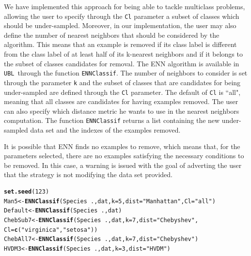 \documentclass[10pt,a4paper]{article}\usepackage[]{graphicx}\usepackage[]{color}
\makeatletter
\newcommand{\hlnum}[1]{\textcolor[rgb]{0.686,0.059,0.569}{#1}}%
\newcommand{\hlstr}[1]{\textcolor[rgb]{0.192,0.494,0.8}{#1}}%
\newcommand{\hlopt}[1]{\textcolor[rgb]{0,0,0}{#1}}%
\newcommand{\hlstd}[1]{\textcolor[rgb]{0.345,0.345,0.345}{#1}}%
\newcommand{\hlkwb}[1]{\textcolor[rgb]{0.69,0.353,0.396}{#1}}%
\newcommand{\hlkwc}[1]{\textcolor[rgb]{0.333,0.667,0.333}{#1}}%
\newcommand{\hlkwd}[1]{\textcolor[rgb]{0.737,0.353,0.396}{\textbf{#1}}}%
\newenvironment{kframe}{%
 \def\at@end@of@kframe{}%
 \ifinner\ifhmode%
  \def\at@end@of@kframe{\end{minipage}}%
  \begin{minipage}{\columnwidth}%
 \fi\fi%
 \def\FrameCommand##1{\hskip\@totalleftmargin \hskip-\fboxsep
 \colorbox{shadecolor}{##1}\hskip-\fboxsep
     \hskip-\linewidth \hskip-\@totalleftmargin \hskip\columnwidth}%
 \MakeFramed {\advance\hsize-\width
   \@totalleftmargin\z@ \linewidth\hsize
   \@setminipage}}%
 {\par\unskip\endMakeFramed%
 \at@end@of@kframe}
\newenvironment{knitrout}{}{} %
\newcommand{\UBL}{\texttt{UBL}\ }
\makeatother
\begin{document}
We have implemented this approach for being able to tackle multiclass problems, allowing the user to specify through the \texttt{Cl} parameter a subset of classes which should be under-sampled. Moreover, in our implementation, the user may also define the number of nearest neighbors that should be considered by the algorithm. This means that an example is removed if its class label is different from the class label of at least half of its k-nearest neighbors and if it belongs to the subset of classes candidates for removal. The ENN algorithm is available in \UBL through the function \texttt{ENNClassif}. The number of neighbors to consider is set through the parameter \texttt{k} and the subset of classes that are candidates for being under-sampled are defined through the \texttt{Cl} parameter. The default of \texttt{Cl} is ``all", meaning that all classes are candidates for having examples removed. The user can also specify which distance metric he wants to use in the nearest neighbors computation. The function \texttt{ENNClassif} returns a list containing the new under-sampled data set and the indexes of the examples removed.

It is possible that ENN finds no examples to remove, which means that, for the parameters selected, there are no examples satisfying the necessary conditions to be removed. In this case, a warning is issued with the goal of adverting the user that the strategy is not modifying the data set provided.


\begin{knitrout}\footnotesize
{}\color{fgcolor}\begin{kframe}
\begin{alltt}
  \hlkwd{set.seed}\hlstd{(}\hlnum{123}\hlstd{)}
  \hlstd{Man5} \hlkwb{<-} \hlkwd{ENNClassif}\hlstd{(Species}\hlopt{~}\hlstd{., dat,} \hlkwc{k}\hlstd{=}\hlnum{5}\hlstd{,} \hlkwc{dist}\hlstd{=}\hlstr{"Manhattan"}\hlstd{,} \hlkwc{Cl}\hlstd{=}\hlstr{"all"}\hlstd{)}
  \hlstd{Default} \hlkwb{<-} \hlkwd{ENNClassif}\hlstd{(Species}\hlopt{~}\hlstd{., dat)}
  \hlstd{ChebSub7} \hlkwb{<-} \hlkwd{ENNClassif}\hlstd{(Species}\hlopt{~}\hlstd{., dat,} \hlkwc{k}\hlstd{=}\hlnum{7}\hlstd{,} \hlkwc{dist}\hlstd{=}\hlstr{"Chebyshev"}\hlstd{,}
                         \hlkwc{Cl}\hlstd{=}\hlkwd{c}\hlstd{(}\hlstr{"virginica"}\hlstd{,} \hlstr{"setosa"}\hlstd{))}
  \hlstd{ChebAll7} \hlkwb{<-} \hlkwd{ENNClassif}\hlstd{(Species}\hlopt{~}\hlstd{., dat,} \hlkwc{k}\hlstd{=}\hlnum{7}\hlstd{,} \hlkwc{dist}\hlstd{=}\hlstr{"Chebyshev"}\hlstd{)}
  \hlstd{HVDM3} \hlkwb{<-} \hlkwd{ENNClassif}\hlstd{(Species}\hlopt{~}\hlstd{., dat,} \hlkwc{k}\hlstd{=}\hlnum{3}\hlstd{,} \hlkwc{dist}\hlstd{=}\hlstr{"HVDM"}\hlstd{)}
\end{alltt}
\end{kframe}
\end{knitrout}
\end{document}
